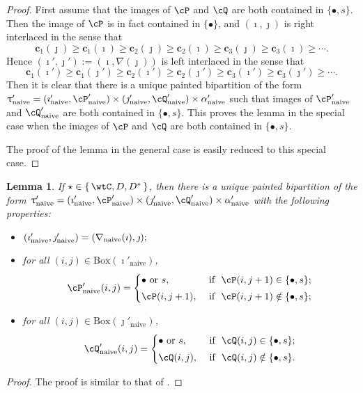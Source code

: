 \documentclass[12pt,a4paper]{amsart}
\def\tnaive{\mathrm{naive}}
\def\uptaupn{\uptau'_{\tnaive}}
\def\alphapn{\alpha'_{\tnaive}}
\def\imathpn{\imath'_{\tnaive}}
\def\jmathpn{\jmath'_{\tnaive}}
\def\DD{\nabla}
\numberwithin{equation}{section}
\newtheorem{lem}[thm]{Lemma}
\theoremstyle{remark}
\def\DD{\nabla}
\newcommand{\BOX}[1]{\mathrm{Box}(#1)}
\def\cPpn{\cP'_\mathrm{naive}}
\def\cQpn{\cQ'_\mathrm{naive}}
\begin{document}
   \begin{proof}
    First assume that the images of $\cP$ and $\cQ$ are both contained in $\{\bullet, s\}$. Then  the image of $\cP$  is in fact contained in $\{\bullet\}$, and $(\imath, \jmath)$ is  right interlaced in the sense that
 \[
 \mathbf{c}_1(\jmath)\geq \mathbf{c}_1(\imath)\geq \mathbf{c}_2(\jmath)\geq \mathbf{c}_2(\imath)\geq \mathbf{c}_3(\jmath)\geq \mathbf{c}_3(\imath) \geq \cdots.
 \]
 Hence $ (\imath',\jmath'):= (\imath,\DD(\jmath))$ is left interlaced in the sense that
 \[
 \mathbf{c}_1(\imath')\geq \mathbf{c}_1(\jmath')\geq \mathbf{c}_2(\imath')\geq \mathbf{c}_2(\jmath')\geq \mathbf{c}_3(\imath')\geq \mathbf{c}_3(\jmath') \geq \cdots.
 \]
 Then it is clear that there is a unique painted bipartition of the form  $\uptaupn=(\imathpn,\cPpn)\times (\jmathpn,\cQpn)\times \alphapn$ such that images of $\cPpn$ and $\cQpn$ are both contained in $\{\bullet, s\}$. This proves the lemma in the special case when the images of $\cP$ and $\cQ$ are both contained in $\{\bullet, s\}$.

 The proof of the lemma in the general case is easily reduced to this special case.
   \end{proof}
    \begin{lem}\label{lemDDn2}
    If $\star \in \set{ \wtC, D,D^*}$, then there is a unique painted bipartition of the form $\uptaupn= (\imathpn,\cPpn)\times (\jmathpn,\cQpn)\times \alphapn$ with the following properties:
  \begin{itemize}
        \item $
   (\imathpn,\jmathpn)= (\DD_\mathrm{naive}(\imath),\jmath); \smallskip
   $
   \item for all $(i,j)\in \BOX{\imathpn}$,
   \[
     \cPpn(i,j)=\begin{cases}
    \bullet \textrm{ or } s,&\textrm{ if  $\ \cP(i,j+1)\in \{\bullet, s\}$;} \smallskip \\
  \cP(i,j+1),& \textrm{ if $\ \cP(i,j+1)\notin \{\bullet, s\}$};\end{cases}
   \]
   \item for all $(i,j)\in \BOX
          {\jmathpn}$,
   \[
     \cQpn(i,j)=\begin{cases}
    \bullet \textrm{ or } s,&\textrm{ if  $\ \cQ(i,j)\in \{\bullet, s\}$;} \smallskip \\
  \cQ(i,j), & \textrm{ if $\ \cQ(i,j)\notin \{\bullet, s\}$}.  \end{cases}
   \]

    \end{itemize}
\end{lem}
\begin{proof}
  The proof is similar to that of .
\end{proof}
\end{document}
